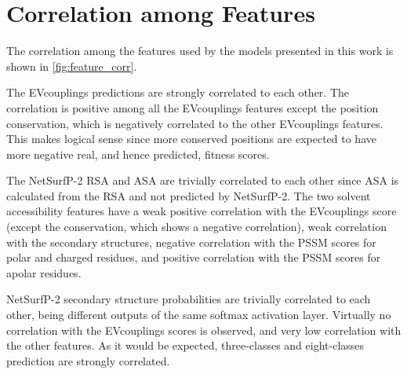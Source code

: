 \section{Correlation among Features}

\begin{figure}[p]
\end{figure}

The correlation among the features used by the models presented in this work is shown in \cref{fig:feature_corr}.

The EVcouplings predictions are strongly correlated to each other.
The correlation is positive among all the EVcouplings features except the position conservation, which is negatively correlated to the other EVcouplings features.
This makes logical sense since more conserved positions are expected to have more negative real, and hence predicted, fitness scores.

The NetSurfP-2 RSA and ASA are trivially correlated to each other since ASA is calculated from the RSA and not predicted by NetSurfP-2.
The two solvent accessibility features have a weak positive correlation with the EVcouplings score (except the conservation, which shows a negative correlation), weak correlation with the secondary structures, negative correlation with the PSSM scores for polar and charged residues, and positive correlation with the PSSM scores for apolar residues.

NetSurfP-2 secondary structure probabilities are trivially correlated to each other, being different outputs of the same softmax activation layer.
Virtually no correlation with the EVcouplings scores is observed, and very low correlation with the other features.
As it would be expected, three-classes and eight-classes prediction are strongly correlated.

